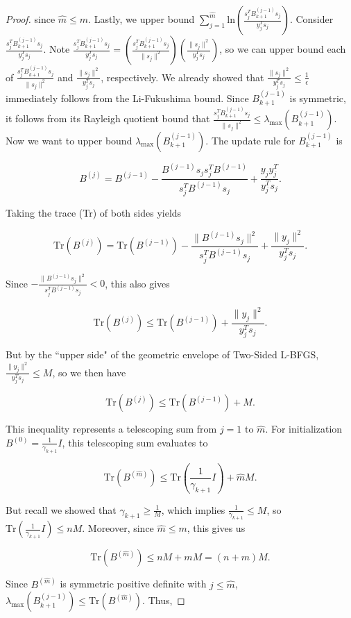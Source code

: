 \documentclass[10pt,a4paper]{amsart}
\begin{document}
\begin{proof}
\noindent
since $\hat{m} \leq m$. Lastly, we upper bound $\sum_{j=1}^{\hat{m}}\text{ln}(\frac{s_j^T B_{k+1}^{(j-1)}s_j}{y_j^T s_j})$. Consider $\frac{s_j^T B_{k+1}^{(j-1)}s_j}{y_j^T s_j}$. Note $\frac{s_j^T B_{k+1}^{(j-1)}s_j}{y_j^T s_j} = (\frac{s_j^T B_{k+1}^{(j-1)}s_j}{\|s_j\|^2})(\frac{\|s_j\|^2}{y_j^T s_j})$, so we can upper bound each of $\frac{s_j^T B_{k+1}^{(j-1)}s_j}{\|s_j\|^2}$ and $\frac{\|s_j\|^2}{y_j^T s_j}$, respectively. We already showed that $\frac{\|s_j\|^2}{y_j^T s_j} \leq \frac{1}{\epsilon}$ immediately follows from the Li-Fukushima bound. Since $B_{k+1}^{(j-1)}$ is symmetric, it follows from its Rayleigh quotient bound that $\frac{s_j^T B_{k+1}^{(j-1)}s_j}{\|s_j\|^2} \leq \lambda_{\text{max}}(B_{k+1}^{(j-1)})$. Now we want to upper bound $\lambda_{\text{max}}(B_{k+1}^{(j-1)})$. The update rule for $B_{k+1}^{(j-1)}$ is

\[
B^{(j)} = B^{(j-1)} - \frac{B^{(j-1)}s_j s_j^T B^{(j-1)}}{s_j^T B^{(j-1)}s_j} + \frac{y_j y_j^T}{y_j^T s_j}.
\]

\noindent
Taking the trace (Tr) of both sides yields

\[
\text{Tr}(B^{(j)}) = \text{Tr}(B^{(j-1)}) - \frac{\|B^{(j-1)}s_j\|^2}{s_j^T B^{(j-1)}s_j} + \frac{\|y_j\|^2}{y_j^T s_j}.
\]

\noindent
Since $- \frac{\|B^{(j-1)}s_j\|^2}{s_j^T B^{(j-1)}s_j} < 0$, this also gives

\[
\text{Tr}(B^{(j)}) \leq \text{Tr}(B^{(j-1)}) + \frac{\|y_j\|^2}{y_j^T s_j}.
\]

\noindent
But by the ``upper side" of the geometric envelope of Two-Sided L-BFGS, $\frac{\|y_j\|^2}{y_j^T s_j} \leq M$, so we then have

\[
\text{Tr}(B^{(j)}) \leq \text{Tr}(B^{(j-1)}) + M.
\]

\noindent
This inequality represents a telescoping sum from $j = 1$ to $\hat{m}$. For initialization $B^{(0)} = \frac{1}{\gamma_{k+1}}I$, this telescoping sum evaluates to

\[
\text{Tr}(B^{(\hat{m})}) \leq \text{Tr}(\frac{1}{\gamma_{k+1}}I) + \hat{m}M.
\]

\noindent
But recall we showed that $\gamma_{k+1} \geq \frac{1}{M}$, which implies $\frac{1}{\gamma_{k+1}} \leq M$, so $\text{Tr}(\frac{1}{\gamma_{k+1}}I) \leq nM$. Moreover, since $\hat{m} \leq m$, this gives us

\[
\text{Tr}(B^{(\hat{m})}) \leq nM + mM = (n+m)M.
\]

\noindent
Since $B^{(\hat{m})}$ is symmetric positive definite with $j \leq \hat{m}$, $\lambda_{\text{max}}(B_{k+1}^{(j-1)}) \leq \text{Tr}(B^{(\hat{m})})$. Thus,


\end{proof}
\end{document}
